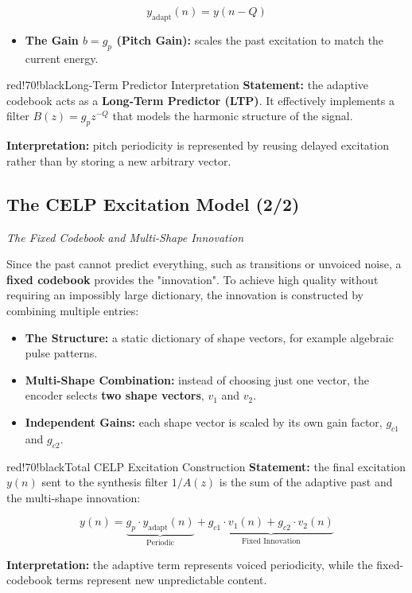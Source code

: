 \[
y_{\text{adapt}}(n) = y(n - Q)
\]

\begin{itemize}
\item \textbf{The Gain $b = g_p$ (Pitch Gain):} scales the past excitation to match the current energy.
\end{itemize}

\begin{calloutbox}{red!70!black}{Long-Term Predictor Interpretation}
\textbf{Statement:} the adaptive codebook acts as a \textbf{Long-Term Predictor (LTP)}. It effectively implements a filter $B(z) = g_p z^{-Q}$ that models the harmonic structure of the signal.

\textbf{Interpretation:} pitch periodicity is represented by reusing delayed excitation rather than by storing a new arbitrary vector.
\end{calloutbox}

\subsection{The CELP Excitation Model (2/2)}

\textit{The Fixed Codebook and Multi-Shape Innovation}

Since the past cannot predict everything, such as transitions or unvoiced noise, a \textbf{fixed codebook} provides the "innovation". To achieve high quality without requiring an impossibly large dictionary, the innovation is constructed by combining multiple entries:

\begin{itemize}
\item \textbf{The Structure:} a static dictionary of shape vectors, for example algebraic pulse patterns.
\item \textbf{Multi-Shape Combination:} instead of choosing just one vector, the encoder selects \textbf{two shape vectors}, $v_1$ and $v_2$.
\item \textbf{Independent Gains:} each shape vector is scaled by its own gain factor, $g_{c1}$ and $g_{c2}$.
\end{itemize}

\begin{calloutbox}{red!70!black}{Total CELP Excitation Construction}
\textbf{Statement:} the final excitation $y(n)$ sent to the synthesis filter $1/A(z)$ is the sum of the adaptive past and the multi-shape innovation:

\[
y(n) = \underbrace{g_p \cdot y_{\text{adapt}}(n)}_{\text{Periodic}} + \underbrace{g_{c1} \cdot v_1(n) + g_{c2} \cdot v_2(n)}_{\text{Fixed Innovation}} \tag{3}
\]

\textbf{Interpretation:} the adaptive term represents voiced periodicity, while the fixed-codebook terms represent new unpredictable content.
\end{calloutbox}

